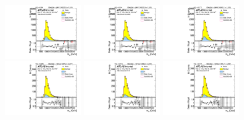 \begin{figure}[htbp!]
\begin{center}
\includegraphics[width=0.3\textwidth,angle=-90]{figures/boosted/AppendixResveto/Moriond_TwoTag_split_Control_mHH_l.pdf}
\includegraphics[width=0.3\textwidth,angle=-90]{figures/boosted/AppendixResveto/Moriond_resveto_TwoTag_split_Control_mHH_l.pdf}
\includegraphics[width=0.3\textwidth,angle=-90]{figures/boosted/AppendixResveto/Moriond_fullresveto_TwoTag_split_Control_mHH_l.pdf}\\
\includegraphics[width=0.3\textwidth,angle=-90]{figures/boosted/AppendixResveto/Moriond_ThreeTag_Control_mHH_l.pdf}
\includegraphics[width=0.3\textwidth,angle=-90]{figures/boosted/AppendixResveto/Moriond_resveto_ThreeTag_Control_mHH_l.pdf}
\includegraphics[width=0.3\textwidth,angle=-90]{figures/boosted/AppendixResveto/Moriond_fullresveto_ThreeTag_Control_mHH_l.pdf}\\

\end{center}
\end{figure}

